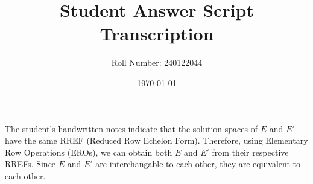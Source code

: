 \documentclass[12pt]{article}
\title{Student Answer Script Transcription}
\author{Roll Number: 240122044}
\date{\today}
\begin{document}
\maketitle

The student's handwritten notes indicate that the solution spaces of \(E\) and \(E'\) have the same RREF (Reduced Row Echelon Form). Therefore, using Elementary Row Operations (EROs), we can obtain both \(E\) and \(E'\) from their respective RREFs. Since \(E\) and \(E'\) are interchangable to each other, they are equivalent to each other.
\end{document}
